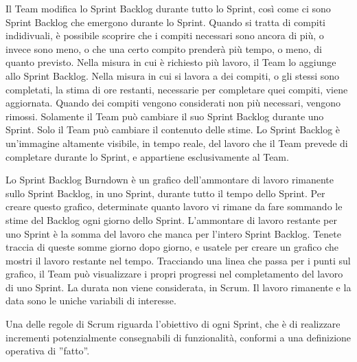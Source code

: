 Il Team modifica lo Sprint Backlog durante tutto lo Sprint, cos\`i come ci sono Sprint Backlog che emergono durante lo Sprint. Quando si tratta di compiti indidivuali, \`e possibile scoprire che i compiti necessari sono ancora di pi\`u, o invece sono meno, o che una certo compito prender\`a pi\`u tempo, o meno, di quanto previsto. Nella misura in cui \`e richiesto pi\`u lavoro, il Team lo aggiunge allo Sprint Backlog. Nella misura in cui si lavora a dei compiti, o gli stessi sono completati, la stima di ore restanti, necessarie per completare quei compiti, viene aggiornata.  Quando dei compiti vengono considerati non pi\`u necessari, vengono rimossi. Solamente il Team pu\`o cambiare il suo Sprint Backlog durante uno Sprint. Solo il Team pu\`o cambiare il contenuto delle stime. Lo Sprint Backlog \`e un'immagine altamente visibile, in tempo reale, del lavoro che il Team prevede di completare durante lo Sprint, e appartiene esclusivamente al Team.
\newline

Lo Sprint Backlog Burndown \`e un grafico dell'ammontare di lavoro rimanente sullo Sprint Backlog, in uno Sprint, durante tutto il tempo dello Sprint. Per creare questo grafico, determinate quanto lavoro vi rimane da fare sommando le stime del Backlog ogni giorno dello Sprint. L'ammontare di lavoro restante per uno Sprint \`e la somma del lavoro che manca per l'intero Sprint Backlog. Tenete traccia di queste somme giorno dopo giorno, e usatele per creare un grafico che mostri il lavoro restante nel tempo. Tracciando una linea che passa per i punti sul grafico, il Team pu\`o visualizzare i propri progressi nel completamento del lavoro di uno Sprint. La durata non viene considerata, in Scrum. Il lavoro rimanente e la data sono le uniche variabili di interesse. 
\newline


Una delle regole di Scrum riguarda l'obiettivo di ogni Sprint, che \`e di realizzare incrementi potenzialmente consegnabili di funzionalit\`a, conformi a una definizione operativa di  ''fatto''.


\subsection*{\color{Blue}{FATTO}}
\label{sec:done}

